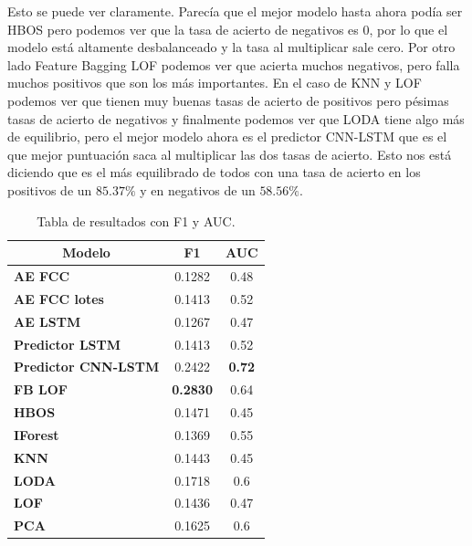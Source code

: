 Esto se puede ver claramente. Parecía que el mejor modelo hasta ahora podía ser HBOS pero podemos ver que la tasa de acierto de negativos es 0, por lo que el modelo está altamente desbalanceado y la tasa al multiplicar sale cero. Por otro lado Feature Bagging LOF podemos ver que acierta muchos negativos, pero falla muchos positivos que son los más importantes. En el caso de KNN y LOF podemos ver que tienen muy buenas tasas de acierto de positivos pero pésimas tasas de acierto de negativos y finalmente podemos ver que LODA tiene algo más de equilibrio, pero el mejor modelo ahora es el predictor CNN-LSTM que es el que mejor puntuación saca al multiplicar las dos tasas de acierto. Esto nos está diciendo que es el más equilibrado de todos con una tasa de acierto en los positivos de un $85.37\%$ y en negativos de un $58.56\%$.

\begin{table}[H]
	\centering
	\begin{tabular}{|l|c|c|}
		\hline
		\multicolumn{1}{|c|}{\textbf{Modelo}} & \textbf{F1}     & \textbf{AUC}  \\ \hline
		\textbf{AE FCC}                       & 0.1282          & 0.48          \\ \hline
		\textbf{AE FCC lotes}                 & 0.1413          & 0.52          \\ \hline
		\textbf{AE LSTM}                      & 0.1267          & 0.47          \\ \hline
		\textbf{Predictor LSTM}               & 0.1413          & 0.52          \\ \hline
		\textbf{Predictor CNN-LSTM}           & 0.2422          & \textbf{0.72} \\ \hline
		\textbf{FB LOF}                       & \textbf{0.2830} & 0.64          \\ \hline
		\textbf{HBOS}                         & 0.1471          & 0.45          \\ \hline
		\textbf{IForest}                      & 0.1369          & 0.55          \\ \hline
		\textbf{KNN}                          & 0.1443          & 0.45          \\ \hline
		\textbf{LODA}                         & 0.1718          & 0.6           \\ \hline
		\textbf{LOF}                          & 0.1436          & 0.47          \\ \hline
		\textbf{PCA}                          & 0.1625          & 0.6           \\ \hline
	\end{tabular}
	\caption{Tabla de resultados con F1 y AUC.}
	\label{tabla:resultados5}
\end{table}

